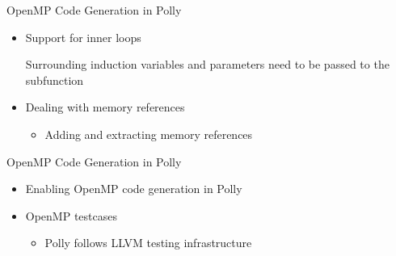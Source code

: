 \documentclass{beamer}
\begin{document}
\begin{frame}{OpenMP Code Generation in Polly}
\begin{itemize}
\item Support for inner loops

\begin{block}{ }
{\footnotesize}
\end{block}
Surrounding induction variables and parameters need to be passed to the subfunction
\pause
\item Dealing with memory references
\begin{block}{ }
{\footnotesize}
\end{block}
	\begin{itemize}
	\item Adding and extracting memory references
	\end{itemize}
\end{itemize}
\end{frame}


\begin{frame}{OpenMP Code Generation in Polly}
\begin{itemize}
\item Enabling OpenMP code generation in Polly
\begin{block}{ }
{\tiny}
\end{block}
\item OpenMP testcases
	\begin{itemize}
	\item Polly follows LLVM testing infrastructure
	\end{itemize}
\end{itemize}
\end{frame}
\end{document}
